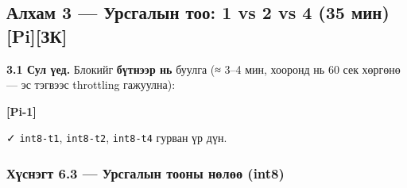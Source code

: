 \hypertarget{ux430ux43bux445ux430ux43c-3-ux443ux440ux441ux433ux430ux43bux44bux43d-ux442ux43eux43e-1-vs-2-vs-4-35-ux43cux438ux43d-piux437ux43a}{%
\subsection{Алхам 3 --- Урсгалын тоо: 1 vs 2 vs 4 (35 мин) {[}Pi{]}{[}ЗК{]}}\label{ux430ux43bux445ux430ux43c-3-ux443ux440ux441ux433ux430ux43bux44bux43d-ux442ux43eux43e-1-vs-2-vs-4-35-ux43cux438ux43d-piux437ux43a}}

\textbf{3.1 Сул үед.} Блокийг \textbf{бүтнээр нь} буулга (≈ 3--4 мин, хооронд нь 60 сек хөргөнө --- эс тэгвээс throttling гажуулна):

\textbf{{[}Pi-1{]}}

\begin{Shaded}
\begin{Highlighting}[]
 \KeywordTok{;} 
   \KeywordTok{\textbackslash{}}
       \KeywordTok{\textbackslash{}}
\end{Highlighting}
\end{Shaded}

✓ \texttt{int8-t1}, \texttt{int8-t2}, \texttt{int8-t4} гурван үр дүн.

\hypertarget{ux445ux4afux441ux43dux44dux433ux442-6.3-ux443ux440ux441ux433ux430ux43bux44bux43d-ux442ux43eux43eux43dux44b-ux43dux4e9ux43bux4e9ux4e9-int8}{%
\subsubsection{Хүснэгт 6.3 --- Урсгалын тооны нөлөө (int8)}\label{ux445ux4afux441ux43dux44dux433ux442-6.3-ux443ux440ux441ux433ux430ux43bux44bux43d-ux442ux43eux43eux43dux44b-ux43dux4e9ux43bux4e9ux4e9-int8}}

